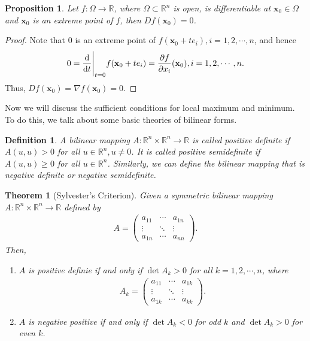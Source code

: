 \documentclass[10pt]{book}
\newtheorem{definition}{Definition}[chapter]
\newtheorem{theorem}{Theorem}[chapter]
\newtheorem{proposition}{Proposition}[chapter]
\theoremstyle{definition}
\numberwithin{equation}{chapter}
\begin{document}
\medskip

\begin{proposition}
Let $f: \Omega \to \mathbb{R}$, where $\Omega \subset \mathbb{R}^n$ is open, is differentiable at $\mathbf{x}_0 \in \Omega$ and $\mathbf{x}_0$ is an extreme point of $f$, then $Df(\mathbf{x}_0) = 0$.
\end{proposition}
\begin{proof}
Note that $0$ is an extreme point of $f(\mathbf{x}_0 + t e_i), i = 1,2,\cdots, n$, and hence
\begin{align*}
    0 = \dv{}{t}\Bigg|_{t=0} f(\mathbf{x}_0 + t e_i) = \frac{\partial f}{\partial x_i}(\mathbf{x}_0), i = 1,2,\cdots, n.
\end{align*}
Thus, $Df(\mathbf{x}_0) = \nabla f(\mathbf{x}_0) = 0$.
\end{proof}

\medskip

Now we will discuss the sufficient conditions for local maximum and minimum. To do this, we talk about some basic theories of bilinear forms.

\medskip

\begin{definition}
A bilinear mapping $A: \mathbb{R}^n \times \mathbb{R}^n \to \mathbb{R}$ is called positive definite if $A(u,u) > 0$ for all $u \in \mathbb{R}^n, u \neq 0$.  It is called positive semidefinite if $A(u,u) \geq 0$ for all $u \in \mathbb{R}^n$. Similarly, we can define the bilinear mapping that is negative definite or negative semidefinite.
\end{definition}

\medskip

\begin{theorem}[Sylvester's Criterion]
Given a symmetric bilinear mapping $A: \mathbb{R}^n \times \mathbb{R}^n \to \mathbb{R}$ defined by
\begin{align*}
    A = \begin{pmatrix}
        a_{11} & \cdots & a_{1n} \\
        \vdots & \ddots & \vdots \\
        a_{1n} & \cdots & a_{nn}
    \end{pmatrix}.
\end{align*}
Then,
\begin{enumerate}[label=(\alph*)]
    \item $A$ is positive definie if and only if $\det A_k > 0$ for all $k = 1,2,\cdots,n$, where
    \begin{align*}
        A_k = \begin{pmatrix}
        a_{11} & \cdots & a_{1k} \\
        \vdots & \ddots & \vdots \\
        a_{1k} & \cdots & a_{kk}
    \end{pmatrix}.
    \end{align*}
    
    \item $A$ is negative positive if and only if $\det A_k < 0$ for odd $k$ and $\det A_k > 0$ for even $k$.
\end{enumerate}
\end{theorem}
\end{document}

